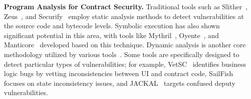 
\noindent
\textbf{Program Analysis for Contract Security.}
Traditional tools such as Slither~\cite{feist2019slither}, Zeus~\cite{kalra2018zeus}, and Securify~\cite{tsankov2018securify} employ static analysis methods to detect vulnerabilities at the source code and bytecode levels. Symbolic execution has also shown significant potential in this area, with tools like Mythril~\cite{Mythril}, Oyente~\cite{luu2016making}, and Manticore~\cite{mossberg2019manticore} developed based on this technique. Dynamic analysis is another core methodology utilized by various tools~\cite{jiang2018contractfuzzer,liu2018reguard,shou2023ityfuzz,qin2023towards}. Some tools are specifically designed to detect particular types of vulnerabilities; for example, VetSC~\cite{duan2022towards} identifies business logic bugs by vetting inconsistencies between UI and contract code, SailFish~\cite{bose2022sailfish} focuses on state inconsistency issues, and JACKAL~\cite{gritti2023confusum} targets confused deputy vulnerabilities.

